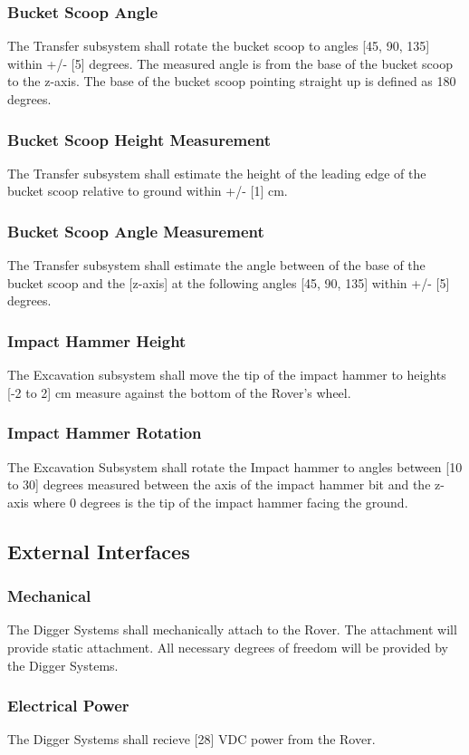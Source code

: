 \subsubsection{Bucket Scoop Angle}
The Transfer subsystem shall rotate the bucket scoop to angles [45, 90, 135] within +/- [5] degrees. The measured angle is from the base of the bucket scoop to the z-axis. The base of the bucket scoop pointing straight up is defined as 180 degrees.
\subsubsection{Bucket Scoop Height Measurement}
The Transfer subsystem shall estimate the height of the leading edge of the bucket scoop relative to ground within +/- [1] cm. 
\subsubsection{Bucket Scoop Angle Measurement}
The Transfer subsystem shall estimate the angle between of the base of the bucket scoop and the [z-axis] at the following angles [45, 90, 135] within +/- [5] degrees.
\subsubsection{Impact Hammer Height}
The Excavation subsystem shall move the tip of the impact hammer to heights [-2 to 2] cm measure against the bottom of the Rover's wheel.
\subsubsection{Impact Hammer Rotation}
The Excavation Subsystem shall rotate the Impact hammer to angles between [10 to 30] degrees measured between the axis of the impact hammer bit and the z-axis where 0 degrees is the tip of the impact hammer facing the ground. 
\subsection{External Interfaces}
\subsubsection{Mechanical}
The Digger Systems shall mechanically attach to the Rover. The attachment will provide static attachment.
All necessary degrees of freedom will be provided by the Digger Systems.
\subsubsection{Electrical Power}
The Digger Systems shall recieve [28] VDC power from the Rover. 

